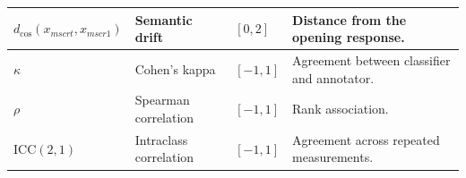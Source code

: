 \begin{longtable*}{|
>{\centering\arraybackslash}p{2.7cm}|
>{\raggedright\arraybackslash}p{4.4cm}|
>{\centering\arraybackslash}p{1.8cm}|
>{\raggedright\arraybackslash}p{5.5cm}|
}
$d_{\cos}(x_{mscrt},x_{mscr1})$ &
Semantic drift &
$[0,2]$ &
Distance from the opening response. \\
\hline


$\kappa$ &
Cohen's kappa &
$[-1,1]$ &
Agreement between classifier and annotator. \\
\hline

$\rho$ &
Spearman correlation &
$[-1,1]$ &
Rank association. \\
\hline

$\mathrm{ICC}(2,1)$ &
Intraclass correlation &
$[-1,1]$ &
Agreement across repeated measurements. \\
\hline

\end{longtable*}
\endgroup
